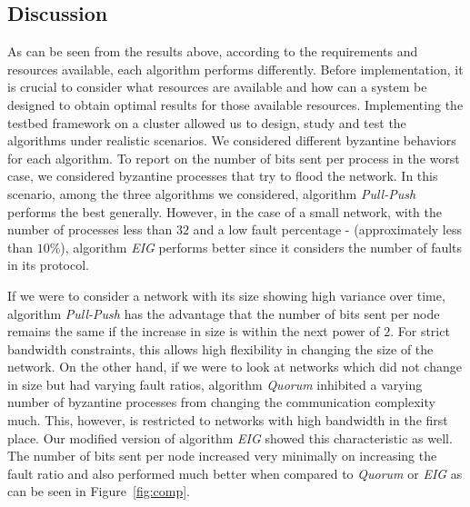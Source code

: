 ﻿\subsection{Discussion}


As can be seen from the results above, according to the requirements and resources available, each algorithm performs differently. Before implementation, it is crucial to consider what resources are available and how can a system be designed to obtain optimal results for those available resources. Implementing the testbed framework on a cluster allowed us to design, study and test the algorithms under realistic scenarios. We considered different byzantine behaviors for each algorithm. To report on the number of bits sent per process in the worst case, we considered byzantine processes that try to flood the network. In this scenario, among the three algorithms we considered, algorithm \textit{Pull-Push} performs the best generally. However, in the case of a small network, with the number of processes less than $32$ and a low fault percentage - (approximately less than $10\%$), algorithm \textit{EIG} performs better since it considers the number of faults in its protocol. 

If we were to consider a network with its size showing high variance over time, algorithm \textit{Pull-Push} has the advantage that the number of bits sent per node remains the same if the increase in size is within the next power of $2$. For strict bandwidth constraints, this allows high flexibility in changing the size of the network. On the other hand, if we were to look at networks which did not change in size but had varying fault ratios, algorithm \textit{Quorum} inhibited a varying number of byzantine processes from changing the communication complexity much. This, however, is restricted to networks with high bandwidth in the first place. Our modified version of algorithm \textit{EIG} showed this characteristic as well. The number of bits sent per node increased very minimally on increasing the fault ratio and also performed much better when compared to \textit{Quorum} or \textit{EIG} as can be seen in Figure~\ref{fig:comp}.

